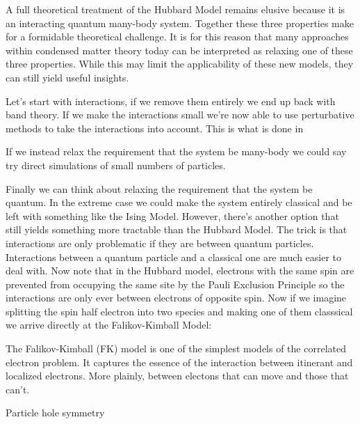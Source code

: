 A full theoretical treatment of the Hubbard Model remains elusive because it is an interacting quantum many-body system. Together these three properties make for a formidable theoretical challenge. It is for this reason that many approaches within condensed matter theory today can be interpreted as relaxing one of these three properties. While this may limit the applicability of these new models, they can still yield useful insights.

Let's start with interactions, if we remove them entirely we end up back with band theory. If we make the interactions small we're now able to use perturbative methods to take the interactions into account. This is what is done in

If we instead relax the requirement that the system be many-body we could say try direct simulations of small numbers of particles.

Finally we can think about relaxing the requirement that the system be quantum. In the extreme case we could make the system entirely classical and be left with something like the Ising Model. However, there's another option that still yields something more tractable than the Hubbard Model. The trick is that interactions are only problematic if they are between quantum particles. Interactions between a quantum particle and a classical one are much easier to deal with. Now note that in the Hubbard model, electrons with the same spin are prevented from occupying the same site by the Pauli Exclusion Principle so the interactions are only ever between electrons of opposite spin. Now if we imagine splitting the spin half electron into two species and making one of them classsical we arrive directly at the Falikov-Kimball Model:

The Falikov-Kimball (FK) model is one of the simplest models of the correlated electron problem. It captures the essence of the interaction between itinerant and localized electrons. More plainly, between electons that can move and those that can't.

Particle hole symmetry

\begin{Shaded}
\begin{Highlighting}[]

\end{Highlighting}
\end{Shaded}
